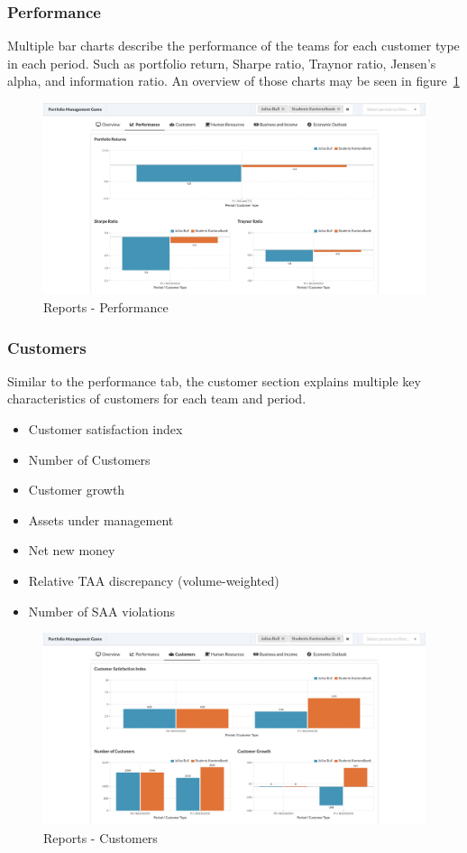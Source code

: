 \subsubsection{Performance}
Multiple bar charts describe the performance of the teams for each customer type in each period. Such as portfolio return, Sharpe ratio, Traynor ratio, Jensen's alpha, and information ratio. An overview of those charts may be seen in figure~\ref{fig:reports_performance}
\begin{figure}[h!]
  \centering
  \includegraphics[scale=0.2]{img/application-overview/reports/02_performance.png}
  \caption{Reports - Performance}
  \label{fig:reports_performance}
\end{figure}

\subsubsection{Customers}
Similar to the performance tab, the customer section explains multiple key characteristics of customers for each team and period.
\begin{itemize}
  \setlength\itemsep{0.01em}
  \item Customer satisfaction index
  \item Number of Customers
  \item Customer growth
  \item Assets under management
  \item Net new money
  \item Relative TAA discrepancy (volume-weighted)
  \item Number of SAA violations
\end{itemize}
\begin{figure}[h!]
  \centering
  \includegraphics[scale=0.2]{img/application-overview/reports/03_customers.png}
  \caption{Reports - Customers}
\end{figure}

